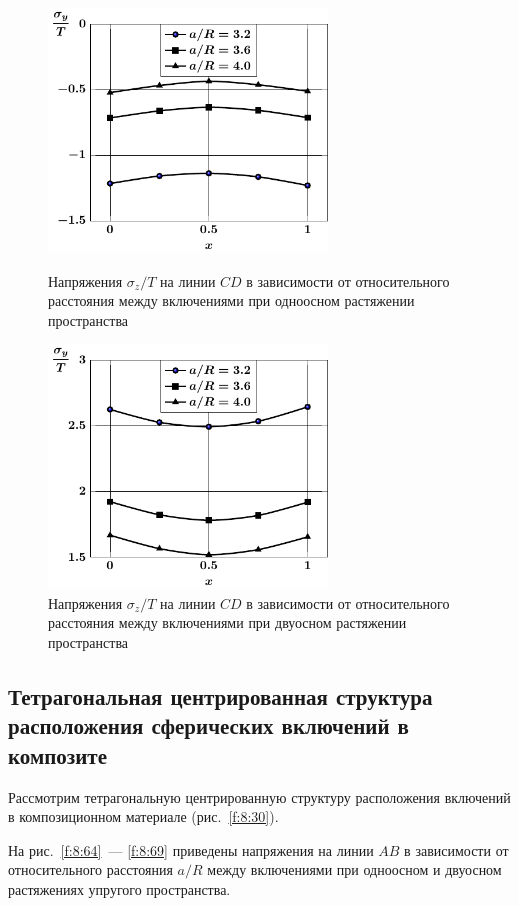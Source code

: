 \begin{figure}[h!]
\centering\footnotesize
\parbox[b]{7.5cm}{\centering\includegraphics[width=7.41cm]{inc5-a-d95-g25-t1-cd-sig_y.pdf}
\caption{Напряжения $\sigma_z/T$ на линии  $CD$ в зависимости от относительного расстояния между включениями при одноосном растяжении пространства
\label{f:8:62}}}\hfil\hfil
\parbox[b]{7.5cm}{\centering\includegraphics[width=7.41cm]{inc5-a-d95-g25-t2-cd-sig_y.pdf}
\caption{Напряжения $\sigma_z/T$ на линии  $CD$ в зависимости от относительного расстояния между включениями при двуосном растяжении пространства
\label{f:8:63}}}
\end{figure}

\subsection{Тетрагональная центрированная структура расположения сферических включений в композите}

Рассмотрим тетрагональную центрированную структуру расположения включений в композиционном материале (рис.~\ref{f:8:30}).

На рис.~\ref{f:8:64}~--- \ref{f:8:69} приведены напряжения на линии $AB$ в зависимости от относительного расстояния $a/R$ между включениями при одноосном и двуосном растяжениях упругого пространства.

